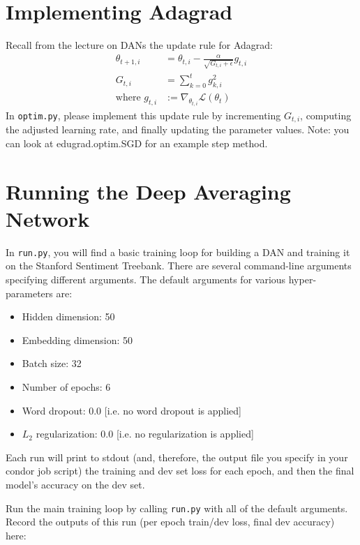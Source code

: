 \documentclass[11pt]{article}
\begin{document}
\section{Implementing Adagrad}

Recall from the lecture on DANs the update rule for Adagrad:
\begin{align*}
  \theta_{t+1, i} &= \theta_{t, i} - \frac{\alpha}{\sqrt{G_{t, i} + \epsilon}} g_{t, i}
  \\
  G_{t, i} &= \sum_{k=0}^t g_{k, i}^2
  \\
  \text{where } g_{t, i} &:= \nabla_{\theta_{t,i}} \mathcal{L}(\theta_t)
\end{align*}
In \texttt{optim.py}, please implement this update rule by incrementing $G_{t, i}$, computing the adjusted learning rate, and finally updating the parameter values.  Note: you can look at edugrad.optim.SGD for an example step method.


\section{Running the Deep Averaging Network}

In \texttt{run.py}, you will find a basic training loop for building a DAN and training it on the Stanford Sentiment Treebank.  There are several command-line arguments specifying different arguments.  The default arguments for various hyper-parameters are:
\begin{itemize}
  \item Hidden dimension: 50
  \item Embedding dimension: 50
  \item Batch size: 32
  \item Number of epochs: 6
  \item Word dropout: 0.0 [i.e. no word dropout is applied]
  \item $L_2$ regularization: 0.0 [i.e. no regularization is applied]
\end{itemize}
Each run will print to stdout (and, therefore, the output file you specify in your condor job script) the training and dev set loss for each epoch, and then the final model's accuracy on the dev set.

\vspace{2em}
 Run the main training loop by calling \texttt{run.py} with all of the default arguments.  Record the outputs of this run (per epoch train/dev loss, final dev accuracy) here:
\end{document}
